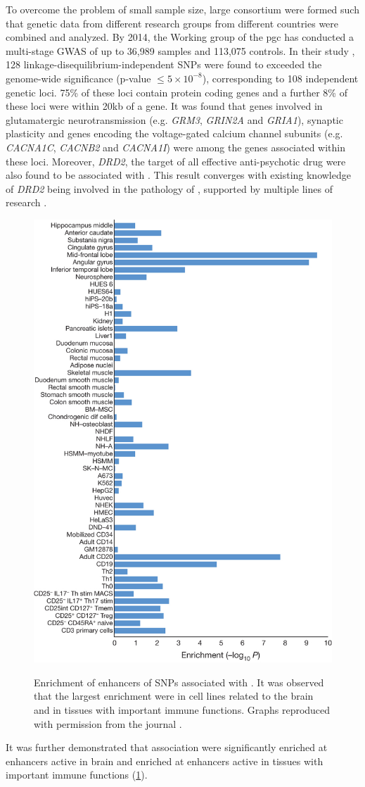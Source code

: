 \documentclass[12pt]{scrbook}
\newcommand*{\glng}{\glsentrylong}
\newcommand*{\Glng}{\Glsentrylong}
\begin{document}
	To overcome the problem of small sample size, large consortium were formed such that genetic data from different research groups from different countries were combined and analyzed.
	By 2014, the \Glng{scz} Working group of the \gls{pgc} has conducted a multi-stage \glng{scz} \gls{GWAS} of up to 36,989 \glng{scz} samples and 113,075 controls.
	In their study \citep{Ripke2014}, 128 linkage-disequilibrium-independent \glspl{SNP} were found to exceeded the genome-wide significance (p-value $\le 5\times10^{-8}$), corresponding to 108 independent genetic loci.
	75\% of these loci contain protein coding genes and a further 8\% of these loci were within 20\gls{kb} of a gene. 
	It was found that genes involved in glutamatergic neurotransmission (e.g. \textit{GRM3}, \textit{GRIN2A} and \textit{GRIA1}), synaptic plasticity and genes encoding the voltage-gated calcium channel subunits (e.g. \textit{CACNA1C}, \textit{CACNB2} and \textit{CACNA1I}) were among the genes associated within these loci.
	Moreover, \textit{DRD2}, the target of all effective anti-psychotic drug were also found to be associated with \glng{scz}.
	This result converges with existing knowledge of \textit{DRD2} being involved in the pathology of \glng{scz}, supported by multiple lines of research \citep{Talkowski2007}.
	\begin{figure}
		\centering
		\caption[Enrichment of enhancers of SNPs associated with Schizophrenia]{Enrichment of enhancers of SNPs associated with \glng{scz}. 
			It was observed that the largest enrichment were in cell lines related to the brain and in tissues with important immune functions. 
			Graphs reproduced with permission from the journal \citep{Ripke2014}.}
		\includegraphics[height=\textwidth]{figure/pgc_enrichment_tissue.jpg}
		\label{fig:pgcEnrich}
	\end{figure}
	It was further demonstrated that \glng{scz} association were significantly enriched at enhancers active in brain and enriched at enhancers active in tissues with important immune functions (\cref{fig:pgcEnrich})\citep{Ripke2014}.
	
\end{document}
